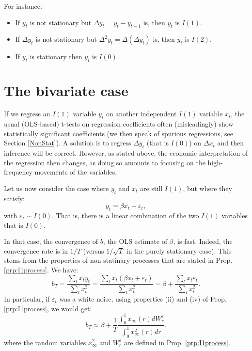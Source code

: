 \documentclass[
  12pt,
]{book}
\providecommand{\tightlist}{%
  \setlength{\itemsep}{0pt}\setlength{\parskip}{0pt}}
\theoremstyle{definition}
\theoremstyle{definition}
\theoremstyle{definition}
\theoremstyle{definition}
\theoremstyle{remark}
\begin{document}
For instance:

\begin{itemize}
\tightlist
\item
  If \(y_t\) is not stationary but \(\Delta y_t = y_t - y_{t-1}\) is, then \(y_t\) is \(I(1)\).
\item
  If \(\Delta y_t\) is not stationary but \(\Delta^2 y_t=\Delta(\Delta y_t)\) is, then \(y_t\) is \(I(2)\).
\item
  If \(y_t\) is stationary then \(y_t\) is \(I(0)\).
\end{itemize}

\hypertarget{the-bivariate-case}{%
\section{The bivariate case}\label{the-bivariate-case}}

If we regress an \(I(1)\) variable \(y_t\) on another independent \(I(1)\) variable \(x_t\), the usual (OLS-based) t-tests on regression coefficients often (misleadingly) show statistically significant coefficients (we then speak of spurious regressions, see Section \ref{NonStat}). A solution is to regress \(\Delta y_t\) (that is \(I(0)\)) on \(\Delta x_t\) and then inference will be correct. However, as stated above, the economic interpretation of the regression then changes, as doing so amounts to focusing on the high-frequency movements of the variables.

Let us now consider the case where \(y_t\) and \(x_t\) are still \(I(1)\), but where they satisfy:
\begin{equation}
y_t = \beta x_t + \varepsilon_t,\label{eq:yxI1}
\end{equation}
with \(\varepsilon_t \sim I(0)\). That is, there is a linear combination of the two \(I(1)\) variables that is \(I(0)\).

In that case, the convergence of \(b\), the OLS estimate of \(\beta\), is fast. Indeed, the convergence rate is in \(1/T\) (versus \(1/\sqrt{T}\) in the purely stationary case). This stems from the properties of non-statinary processes that are stated in Prop. \ref{prp:I1process}. We have:
\[
b_T = \frac{\sum_t x_t y_t}{\sum_t x_t^2} = \frac{\sum_t x_t (\beta x_t + \varepsilon_t)}{\sum_t x_t^2}
= \beta + \frac{\sum_t x_t \varepsilon_t}{\sum_t x_t^2}.
\]
In particular, if \(\varepsilon_t\) was a white noise, using properties (ii) and (iv) of Prop. \ref{prp:I1process}, we would get:
\begin{equation}
b_T \approx \beta + \frac{1}{T}\frac{\int_{0}^{1}x_{\infty}(r)dW^{\varepsilon}_r}{\int_{0}^{1}x^2_{\infty}(r)dr}.\label{eq:bTsuperconv}
\end{equation}
where the random variables \(x^2_{\infty}\) and \(W^{\varepsilon}_r\) are defined in Prop. \ref{prp:I1process}.
\end{document}

